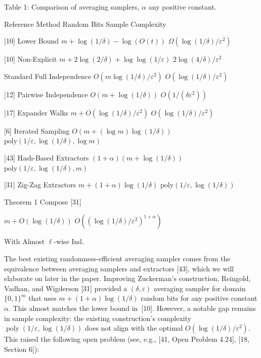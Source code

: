Table 1: Comparison of averaging samplers, $\alpha$ any positive constant.




Reference 
Method 
Random Bits 
Sample Complexity 
\par


[10] 
Lower Bound 
$m+\log(1/\delta)-\log(O(t))$ 
$\Omega(\log(1/\delta)/\varepsilon^{2})$ 
\par


[10] 
Non-Explicit 
$m+2\log(2/\delta)+\log\log(1/\varepsilon)$ 
$2\log(4/\delta)/\varepsilon^{2}$ 
\par


Standard 
Full Independence 
$O(m\log(1/\delta)/\varepsilon^{2})$ 
$O(\log(1/\delta)/\varepsilon^{2})$ 
\par


[12] 
Pairwise Independence 
$O(m+\log(1/\delta))$ 
$O(1/(\delta\varepsilon^{2}))$ 
\par


[17] 
Expander Walks 
$m+O(\log(1/\delta)/\varepsilon^{2})$ 
$O(\log(1/\delta)/\varepsilon^{2})$ 
\par


[6] 
Iterated Sampling 
$O(m+(\log m)\log(1/\delta))$ 
$\text{poly}(1/\varepsilon,\log(1/\delta),\log m)$ 
\par


[43] 
Hash-Based Extractors 
$(1+\alpha)(m+\log(1/\delta))$ 
$\text{poly}(1/\varepsilon,\log(1/\delta),m)$ 
\par


[31] 
Zig-Zag Extractors 
$m+(1+\alpha)\log(1/\delta)$ 
$\text{poly}(1/\varepsilon,\log(1/\delta))$ 
\par


Theorem 1 
Compose [31]
 
$m+O(\log(1/\delta))$ 
$O((\log(1/\delta)/\varepsilon^{2})^{1+\alpha})$ 
\par


 
With Almost $\ell$-wise Ind. 
 
 
\par







The best existing randomness-efficient averaging sampler comes from the equivalence between averaging samplers and extractors [43], which we will elaborate on later in the paper. Improving Zuckerman’s construction, Reingold, Vadhan, and Wigderson [31] provided a $(\delta,\varepsilon)$ averaging sampler for domain $\{0,1\}^{m}$ that uses $m+(1+\alpha)\log(1/\delta)$ random bits for any positive constant $\alpha$. This almost matches the lower bound in [10]. However, a notable gap remains in sample complexity: the existing construction’s complexity $\operatorname*{poly}(1/\varepsilon,\log(1/\delta))$ does not align with the optimal $O(\log(1/\delta)/\varepsilon^{2})$. This raised the following open problem (see, e.g., [41, Open Problem 4.24], [18, Section 6]):\par



